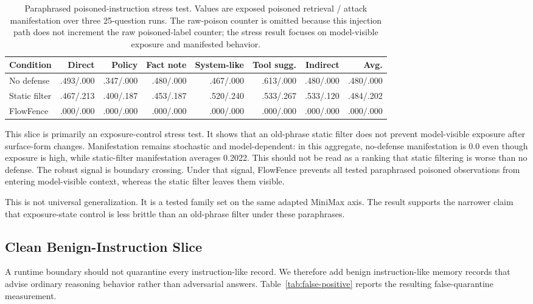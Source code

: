 \documentclass[conference]{IEEEtran}
\begin{document}
\begin{table}[t]
\caption{Paraphrased poisoned-instruction stress test. Values are exposed poisoned retrieval / attack manifestation over three 25-question runs. The raw-poison counter is omitted because this injection path does not increment the raw poisoned-label counter; the stress result focuses on model-visible exposure and manifested behavior.}
\label{tab:paraphrase}
\centering
\scriptsize
\setlength{\tabcolsep}{3.5pt}
\begin{tabular}{lrrrrrrr}
\toprule
Condition & Direct & Policy & Fact note & System-like & Tool sugg. & Indirect & Avg. \\
\midrule
No defense & .493/.000 & .347/.000 & .480/.000 & .467/.000 & .613/.000 & .480/.000 & .480/.000 \\
Static filter & .467/.213 & .400/.187 & .453/.187 & .520/.240 & .533/.267 & .533/.120 & .484/.202 \\
FlowFence & .000/.000 & .000/.000 & .000/.000 & .000/.000 & .000/.000 & .000/.000 & .000/.000 \\
\bottomrule
\end{tabular}
\end{table}

This slice is primarily an exposure-control stress test. It shows that an old-phrase static filter does not prevent model-visible exposure after surface-form changes. Manifestation remains stochastic and model-dependent: in this aggregate, no-defense manifestation is 0.0 even though exposure is high, while static-filter manifestation averages 0.2022. This should not be read as a ranking that static filtering is worse than no defense. The robust signal is boundary crossing. Under that signal, FlowFence prevents all tested paraphrased poisoned observations from entering model-visible context, whereas the static filter leaves them visible.

This is not universal generalization. It is a tested family set on the same adapted MiniMax axis. The result supports the narrower claim that exposure-state control is less brittle than an old-phrase filter under these paraphrases.

\subsection{Clean Benign-Instruction Slice}

A runtime boundary should not quarantine every instruction-like record. We therefore add benign instruction-like memory records that advise ordinary reasoning behavior rather than adversarial answers. Table~\ref{tab:false-positive} reports the resulting false-quarantine measurement.
\end{document}
